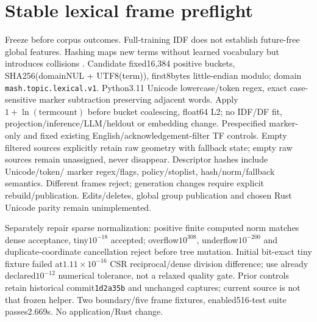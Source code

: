 \documentclass[11pt]{article}
\begin{document}
\section{Stable lexical frame preflight}
Freeze  before corpus outcomes.
Full-training IDF does not establish future-free global features. Hashing maps
new terms without learned vocabulary but introduces collisions
\cite{sklearnfeaturehashing}. Candidate fixed16,384 positive buckets,
SHA256(domainNUL + UTF8(term)), first8bytes little-endian modulo; domain
\texttt{mash.topic.lexical.v1}. Python3.11 Unicode lowercase/token regex,
exact case-sensitive marker subtraction preserving adjacent words. Apply
$1+\ln(\mathrm{termcount})$ before bucket coalescing, float64 L2; no IDF/DF fit,
projection/inference/LLM/heldout or embedding change. Prespecified marker-only
and fixed existing English/acknowledgement-filter TF controls. Empty filtered
sources explicitly retain raw geometry with fallback state; empty raw sources
remain unassigned, never disappear. Descriptor hashes include Unicode/token/
marker regex/flags, policy/stoplist, hash/norm/fallback semantics. Different frames
reject; generation changes require explicit rebuild/publication. Edits/deletes,
global group publication and chosen Rust Unicode parity remain unimplemented.

Separately repair sparse normalization: positive finite computed norm matches
dense acceptance, tiny$10^{-18}$ accepted; overflow$10^{308}$, underflow$10^{-200}$
and duplicate-coordinate cancellation reject before tree mutation. Initial
bit-exact tiny fixture failed at$1.11\times10^{-16}$ CSR reciprocal/dense division
difference; use already declared$10^{-12}$ numerical tolerance, not a relaxed
quality gate. Prior controls retain historical commit\texttt{1d2a35b} and unchanged
captures; current source is not that frozen helper. Two boundary/five frame
fixtures, enabled516-test suite passes2.669s. No application/Rust change.
\end{document}
